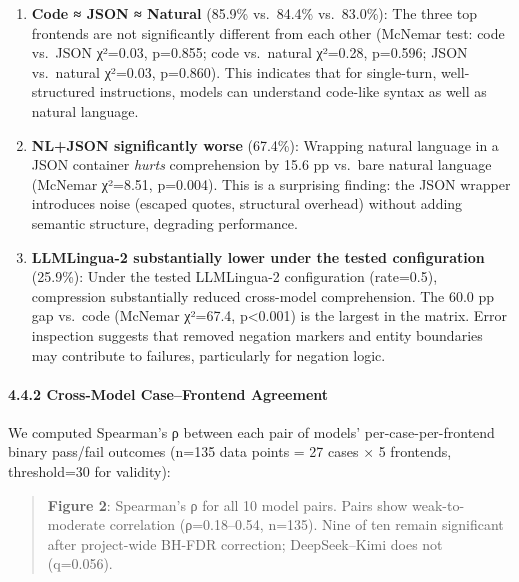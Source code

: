 \begin{enumerate}

\def\labelenumi{\arabic{enumi}.}

\item

  \textbf{Code ≈ JSON ≈ Natural} (85.9\% vs.~84.4\% vs.~83.0\%): The three top frontends are not significantly different from each other (McNemar test: code vs.~JSON χ²=0.03, p=0.855; code vs.~natural χ²=0.28, p=0.596; JSON vs.~natural χ²=0.03, p=0.860). This indicates that for single-turn, well-structured instructions, models can understand code-like syntax as well as natural language.

\item

  \textbf{NL+JSON significantly worse} (67.4\%): Wrapping natural language in a JSON container \emph{hurts} comprehension by 15.6 pp vs.~bare natural language (McNemar χ²=8.51, p=0.004). This is a surprising finding: the JSON wrapper introduces noise (escaped quotes, structural overhead) without adding semantic structure, degrading performance.

\item

  \textbf{LLMLingua-2 substantially lower under the tested configuration} (25.9\%): Under the tested LLMLingua-2 configuration (rate=0.5), compression substantially reduced cross-model comprehension. The 60.0 pp gap vs.~code (McNemar χ²=67.4, p\textless0.001) is the largest in the matrix. Error inspection suggests that removed negation markers and entity boundaries may contribute to failures, particularly for negation logic.

\end{enumerate}



\paragraph{4.4.2 Cross-Model Case--Frontend Agreement}\label{cross-model-casefrontend-agreement}



We computed Spearman's ρ between each pair of models' per-case-per-frontend binary pass/fail outcomes (n=135 data points = 27 cases × 5 frontends, threshold=30 for validity):



\begin{quote}

\textbf{Figure 2}: Spearman's ρ for all 10 model pairs. Pairs show weak-to-moderate correlation (ρ=0.18--0.54, n=135). Nine of ten remain significant after project-wide BH-FDR correction; DeepSeek--Kimi does not (q=0.056).

\end{quote}



